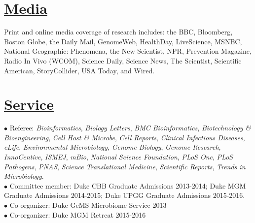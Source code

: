 \documentclass[overlapped,line,11pt]{res}
\begin{document}
\begin{resume}
\begin{itemize}[leftmargin=1cm, style=sameline, itemsep=0mm]
\end{itemize}

\section{\underline{\sc Media}} 
\vspace{.05in} Print and online media coverage of research includes:
the BBC, Bloomberg, Boston Globe, the Daily Mail, GenomeWeb,
HealthDay, LiveScience, MSNBC, National Geographic: Phenomena, the New
Scientist, NPR, Prevention Magazine, Radio In Vivo (WCOM), Science Daily, Science News, The
Scientist, Scientific American, StoryCollider, USA Today, and Wired.


\section{\underline{\sc Service}}
\vspace{.05in}

\hangindent=0.5in $\bullet$\hspace{.1in} Referee:
\emph{Bioinformatics}, \emph{Biology Letters}, \emph{BMC Bioinformatics}, \emph{Biotechnology \& Bioengineering}, \emph{Cell Host \& Microbe}, \emph{Cell Reports}, \emph{Clinical
  Infectious Diseases}, \emph{eLife}, \emph{Environmental Microbiology}, \emph{Genome Biology}, \emph{Genome
  Research}, \emph{InnoCentive}, \emph{ISMEJ}, \emph{mBio}, \emph{National Science Foundation}, \emph{PLoS One},
\emph{PLoS Pathogens}, \emph{PNAS}, \emph{Science Translational Medicine}, \emph{Scientific Reports}, \emph{Trends in Microbiology}. \\

\vspace{-10mm} \hangindent=0.5in $\bullet$\hspace{.1in} Committee
member: Duke CBB Graduate Admissions 2013-2014; Duke MGM Graduate
Admissions 2014-2015; Duke UPGG Graduate Admissions 2015-2016. \\

\vspace{-10mm}
\hangindent=0.5in $\bullet$\hspace{.1in} Co-organizer: Duke GeMS
Microbiome Service 2013- \\

\vspace{-10mm}
\hangindent=0.5in $\bullet$\hspace{.1in} Co-organizer: 
 Duke MGM Retreat 2015-2016 \\


\end{resume}
\end{document}
